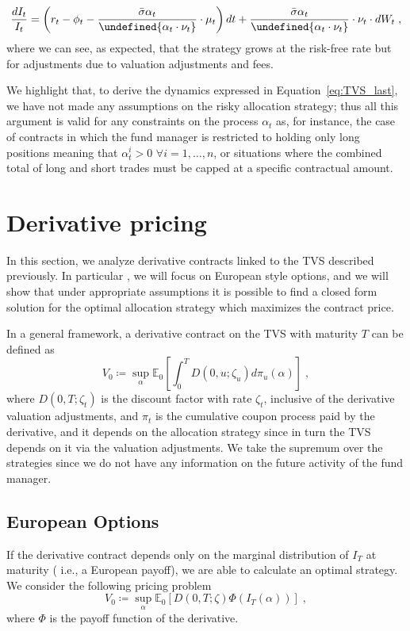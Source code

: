 \documentclass[runningheads]{m2ef}
\let\norm\undefined %
\DeclarePairedDelimiter\norm{\lVert}{\rVert}
\newcommand{\change}[1]{{\color{red} {#1}}}%
\begin{document}
\begin{equation}
     \frac{dI_t}{I_t} = \left(r_t -  \phi_t     - \frac{\bar{\sigma} \alpha_t}{\norm {\alpha_t \cdot \nu_t }}  \cdot \mu_t \right)dt+ \frac{\bar{\sigma}\alpha_t }{\norm{ \alpha_t \cdot \nu_t }} \cdot \nu_t \cdot dW_t \; ,
\label{eq:TVS_last}\end{equation}
where we can see, as expected, that the strategy grows at the risk-free rate but for adjustments due to valuation adjustments and fees.

We highlight that, to derive the dynamics expressed in Equation~\eqref{eq:TVS_last}, we have not made any assumptions on the risky allocation strategy; thus all this argument is valid for any constraints on the process $\alpha_t$\change{ as, for instance, the case of contracts in which the fund manager is restricted to holding only long positions meaning that $\alpha_t^i>0$ $\forall i = 1,\dots,n$, or situations where the combined total of long and short trades must be capped at a specific contractual amount}.


\section{Derivative pricing}\label{sec:Derivative}
In this section, we analyze derivative contracts linked to the TVS described previously. In particular\change{,} we will focus on European style options, and we will show that under appropriate assumptions it is possible to find a closed form solution for the optimal allocation strategy which maximizes the contract price.

In a general framework, a derivative contract on the TVS with maturity $T$ can be defined as
\begin{equation}
    V_0 \coloneqq \sup_\alpha \mathbb{E}_0\left[\int_0^T D(0,u;\zeta_u)d\pi_u(\alpha)\right] \; ,
\end{equation}
where $D(0,T;\zeta_t)$ is the discount factor with rate $\zeta_t$, inclusive of the derivative valuation adjustments, and $\pi_t$ is the cumulative coupon process paid by the derivative, and it depends on the allocation strategy since in turn the TVS depends on it via the valuation adjustments. We take the supremum over the strategies since we do not have any information on the future activity of the fund manager.


\subsection{European Options}
If the derivative contract depends only on the marginal distribution of $I_T$ at maturity (\change{i.e.,} a European payoff), we are able to calculate an optimal strategy. We consider the following pricing problem
\begin{equation}
    V_0 \coloneqq \sup_\alpha \mathbb{E}_0\left[D(0,T;\zeta)\Phi(I_T(\alpha))\right] \; ,
\end{equation}
where $\Phi$ is the payoff function of the derivative. 
\end{document}

